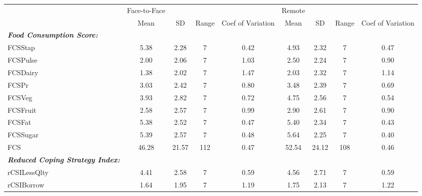 {
\def\sym#1{\ifmmode^{#1}\else\(^{#1}\)\fi}
\begin{tabular}{l*{2}{cccc}}
\hline\hline
            &Face-to-Face&            &            &            &      Remote&            &            &            \\
            &        Mean&          SD&       Range&Coef of Variation&        Mean&          SD&       Range&Coef of Variation\\
\hline
      \textbf{\textit{Food Consumption Score:}}&            &            &            &            &            &            &            &            \\
FCSStap     &        5.38&        2.28&           7&        0.42&        4.93&        2.32&           7&        0.47\\
FCSPulse    &        2.00&        2.06&           7&        1.03&        2.50&        2.24&           7&        0.90\\
FCSDairy    &        1.38&        2.02&           7&        1.47&        2.03&        2.32&           7&        1.14\\
FCSPr       &        3.03&        2.42&           7&        0.80&        3.48&        2.39&           7&        0.69\\
FCSVeg      &        3.93&        2.82&           7&        0.72&        4.75&        2.56&           7&        0.54\\
FCSFruit    &        2.58&        2.57&           7&        0.99&        2.90&        2.61&           7&        0.90\\
FCSFat      &        5.38&        2.52&           7&        0.47&        5.40&        2.34&           7&        0.43\\
FCSSugar    &        5.39&        2.57&           7&        0.48&        5.64&        2.25&           7&        0.40\\
FCS         &       46.28&       21.57&         112&        0.47&       52.54&       24.12&         108&        0.46\\
      \textbf{\textit{Reduced Coping Strategy Index:}}&            &            &            &            &            &            &            &            \\
rCSILessQlty&        4.41&        2.58&           7&        0.59&        4.56&        2.71&           7&        0.59\\
rCSIBorrow  &        1.64&        1.95&           7&        1.19&        1.75&        2.13&           7&        1.22\\

\end{tabular}}
